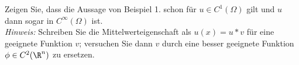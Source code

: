 
\begin{exercise}

Zeigen Sie, dass die Aussage von Beispiel 1. schon für $u \in C^1(\Omega)$ gilt und $u$ dann sogar in $C^\infty(\Omega)$ ist. \\
\textit{Hinweis:}
Schreiben Sie die Mittelwerteigenschaft als $u(x) = u \ast v$ für eine geeignete Funktion $v$;
versuchen Sie dann $v$ durch eine besser geeignete Funktion $\phi \in C^2(\R^n)$ zu ersetzen.

\end{exercise}


\begin{solution}




\end{solution}
